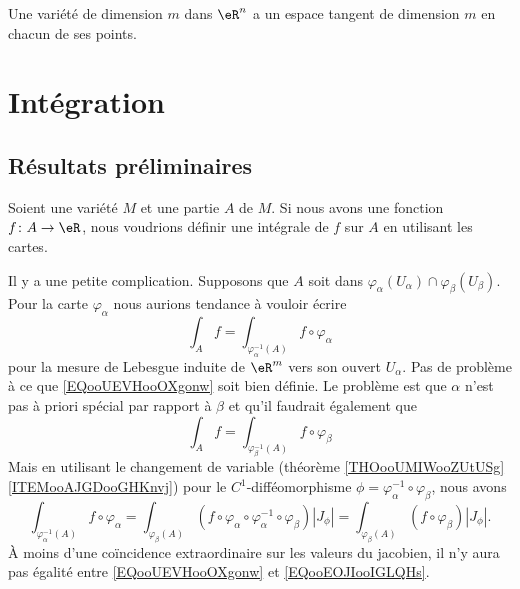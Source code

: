 \begin{proposition}         \label{PropDimEspTanVarConst}
    Une variété de dimension $m$ dans $\eR^n$ a un espace tangent de dimension $m$ en chacun de ses points.
\end{proposition}

\section{Intégration}

\subsection{Résultats préliminaires}

Soient une variété \( M\) et une partie \( A\) de \( M\). Si nous avons une fonction \( f\colon A\to \eR\), nous voudrions définir une intégrale de \( f\) sur \( A\) en utilisant les cartes.

Il y a une petite complication. Supposons que \( A\) soit dans \( \varphi_{\alpha}(U_{\alpha})\cap \varphi_{\beta}(U_{\beta})\). Pour la carte \( \varphi_{\alpha}\) nous aurions tendance à vouloir écrire
\begin{equation}        \label{EQooUEVHooOXgonw}
    \int_A f=\int_{\varphi_{\alpha}^{-1}(A)}f\circ \varphi_{\alpha}
\end{equation}
pour la mesure de Lebesgue induite de \( \eR^m\) vers son ouvert \( U_{\alpha}\). Pas de problème à ce que \eqref{EQooUEVHooOXgonw} soit bien définie. Le problème est que \( \alpha\) n'est pas à priori spécial par rapport à \( \beta\) et qu'il faudrait également que
\begin{equation}        \label{EQooEOJIooIGLQHs}
    \int_A f=\int_{\varphi_{\beta}^{-1}(A)}f\circ \varphi_{\beta}
\end{equation}
Mais en utilisant le changement de variable (théorème \ref{THOooUMIWooZUtUSg}\ref{ITEMooAJGDooGHKnvj}) pour le \( C^1\)-difféomorphisme \( \phi=\varphi_{\alpha}^{-1}\circ \varphi_{\beta}\), nous avons
\begin{equation}
    \int_{\varphi_{\alpha}^{-1}(A)}f\circ \varphi_{\alpha}=\int_{\varphi_{\beta}(A)}(f\circ \varphi_{\alpha}\circ\varphi_{\alpha}^{-1}\circ\varphi_{\beta})| J_{\phi} |=\int_{\varphi_{\beta}(A)}(f\circ \varphi_{\beta})| J_{\phi} |.
\end{equation}
À moins d'une coïncidence extraordinaire sur les valeurs du jacobien, il n'y aura pas égalité entre \eqref{EQooUEVHooOXgonw} et \eqref{EQooEOJIooIGLQHs}.

